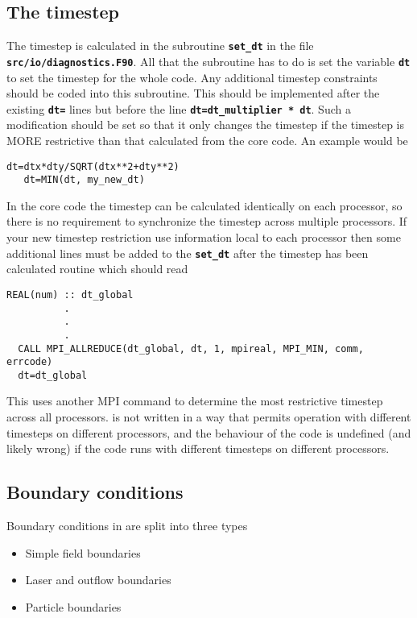 \documentclass[12pt,a4paper]{article}
\newcommand{\simpleboxverbatim}{\begin{Verbatim}[obeytabs=true,frame=single,
  framerule=0.5mm,rulecolor=\color{warwickmid},formatcom=\color{black}]}
\newcommand{\inlinecode}[1]{{\color{warwickred} \bf\texttt{#1}}}
\newcommand{\EPOCH}{{\color{warwickdark}\fontfamily{phv}\selectfont{EPOCH}}}
\begin{document}
\subsection{The timestep}

The timestep is calculated in the subroutine \inlinecode{set\_dt} in the file
\inlinecode{src/io/diagnostics.F90}. All that the subroutine has to do is set
the variable \inlinecode{dt} to set the timestep for the whole code. Any
additional timestep constraints should be coded into this subroutine. This
should be implemented after the existing \inlinecode{dt=} lines but before the
line \inlinecode{dt=dt\_multiplier * dt}. Such a modification should be set so
that it only changes the timestep if the timestep is MORE restrictive than that
calculated from the core code. An example would be

\simpleboxverbatim
   dt=dtx*dty/SQRT(dtx**2+dty**2)
   dt=MIN(dt, my_new_dt)
\end{Verbatim}

In the core {\EPOCH} code the timestep can be calculated identically on each
processor, so there is no requirement to synchronize the timestep across
multiple processors. If your new timestep restriction use information local to
each processor then some additional lines must be added to the
\inlinecode{set\_dt} after the timestep has been calculated routine which
should read

\simpleboxverbatim
  REAL(num) :: dt_global
          .
          .
          .
  CALL MPI_ALLREDUCE(dt_global, dt, 1, mpireal, MPI_MIN, comm, errcode)
  dt=dt_global
\end{Verbatim}

This uses another MPI command to determine the most restrictive timestep across
all processors. {\EPOCH} is not written in a way that permits operation with
different timesteps on different processors, and the behaviour of the code is
undefined (and likely wrong) if the code runs with different timesteps on
different processors.

\subsection{Boundary conditions}
Boundary conditions in {\EPOCH} are split into three types
\begin{itemize}
\item Simple field boundaries
\item Laser and outflow boundaries
\item Particle boundaries
\end{itemize}
\end{document}
